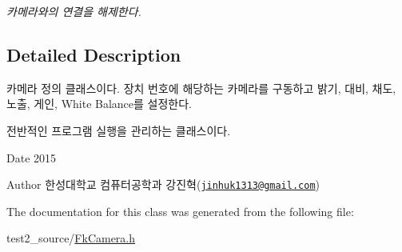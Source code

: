 \begin{DoxyCompactItemize}
\begin{DoxyCompactList}\small\item\em 카메라와의 연결을 해제한다. \end{DoxyCompactList}\end{DoxyCompactItemize}


\subsection{Detailed Description}
카메라 정의 클래스이다. 장치 번호에 해당하는 카메라를 구동하고 밝기, 대비, 채도, 노출, 게인, White Balance를 설정한다. 

전반적인 프로그램 실행을 관리하는 클래스이다.

\begin{DoxyDate}{Date}
2015 
\end{DoxyDate}
\begin{DoxyAuthor}{Author}
한성대학교 컴퓨터공학과 강진혁(\href{mailto:jinhuk1313@gmail.com}{\tt jinhuk1313@gmail.\+com}) 
\end{DoxyAuthor}


The documentation for this class was generated from the following file\+:\begin{DoxyCompactItemize}
\item 
test2\+\_\+source/\hyperlink{_fk_camera_8h}{Fk\+Camera.\+h}\end{DoxyCompactItemize}
